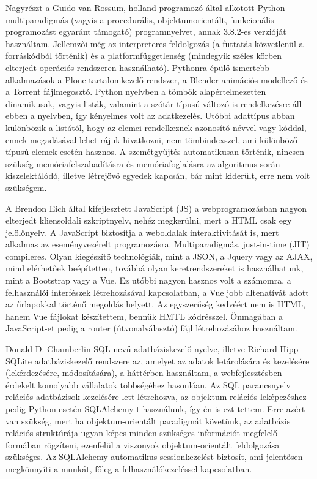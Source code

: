 \documentclass[a4paper,12pt]{article}
\begin{document}
Nagyrészt a Guido van Rossum, holland programozó által alkotott Python multiparadigmás 
(vagyis a procedurális, objektumorientált, funkcionális programozást egyaránt támogató)
programnyelvet, annak 3.8.2-es verzióját használtam. Jellemzői még az interpreteres 
feldolgozás (a futtatás közvetlenül a forráskódból történik) és a platformfüggetlenség 
(mindegyik széles körben elterjedt operációs rendszeren használható). Pythonra épülő
ismertebb alkalmazások a Plone tartalomkezelő rendszer, a Blender animációs modellező
és a Torrent fájlmegosztó. Python nyelvben a tömbök alapértelmezetten dinamikusak, vagyis
listák, valamint a szótár típusú változó is rendelkezésre áll ebben a nyelvben, így 
kényelmes volt az adatkezelés. Utóbbi adattípus abban különbözik a listától, hogy az 
elemei rendelkeznek azonosító névvel vagy kóddal, ennek megadásával lehet rájuk hivatkozni, 
nem tömbindexszel, ami különböző típusú elemek esetén hasznos. A szemétgyűjtés 
automatikusan történik, nincsen szükség memóriafelszabadításra és memóriafoglalásra az 
algoritmus során kiszelektálódó, illetve létrejövő egyedek kapcsán, bár mint kiderült,
erre nem volt szükségem.

A Brendon Eich által kifejlesztett JavaScript (JS) a webprogramozásban nagyon elterjedt
kliensoldali szkriptnyelv, nehéz megkerülni, mert a HTML csak egy jelölőnyelv. A JavaScript 
biztosítja a weboldalak interaktivitását is, mert alkalmas az eseményvezérelt programozásra. 
Multiparadigmás, just-in-time (JIT) compileres. Olyan kiegészítő technológiák, mint a JSON, 
a Jquery vagy az AJAX, mind elérhetőek beépítetten, továbbá olyan keretrendszereket is 
használhatunk, mint a Bootstrap vagy a Vue. Ez utóbbi nagyon hasznos volt a számomra, a 
felhasználói interfészek létrehozásával kapcsolatban, a Vue jobb altenatívát adott az 
űrlapokkal történő megoldás helyett. Az egyszerűség kedvéért nem is HTML, hanem Vue fájlokat
készítettem, bennük HMTL kódrésszel. Önmagában a JavaScript-et pedig a router 
(útvonalválasztó) fájl létrehozásához használtam.

Donald D. Chamberlin SQL nevű adatbáziskezelő nyelve, illetve Richard Hipp SQLite 
adatbáziskezelő rendszere az, amelyet az adatok letárolására és kezelésére (lekérdezésére, 
módosítására), a háttérben használtam, a webfejlesztésben érdekelt komolyabb vállalatok 
többségéhez hasonlóan. Az SQL parancsnyelv relációs adatbázisok kezelésére lett létrehozva, 
az objektum-relációs leképezéshez pedig Python esetén SQLAlchemy-t használunk, így én is ezt 
tettem. Erre azért van szükség, mert ha objektum-orientált paradigmát követünk, az adatbázis 
relációs struktúrája ugyan képes minden szükséges információt megfelelő formában rögzíteni, 
ezenfelül a viszonyok objektum-orientált feldolgozása szükséges. Az SQLAlchemy automatikus 
sessionkezelést biztosít, ami jelentősen megkönnyíti a munkát, főleg a felhasználókezeléssel 
kapcsolatban.
\end{document}
